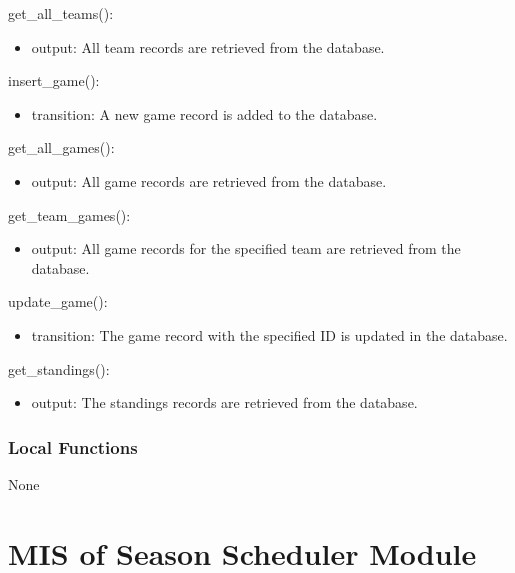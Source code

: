 \documentclass[12pt, titlepage]{article}
\begin{document}
\noindent get\_all\_teams():
\begin{itemize}
\item output: All team records are retrieved from the database.
\end{itemize}

\noindent insert\_game():
\begin{itemize}
\item transition: A new game record is added to the database.
\end{itemize}

\noindent get\_all\_games():
\begin{itemize}
\item output: All game records are retrieved from the database.
\end{itemize}

\noindent get\_team\_games():
\begin{itemize}
\item output: All game records for the specified team are retrieved from the database.
\end{itemize}

\noindent update\_game():
\begin{itemize}
\item transition: The game record with the specified ID is updated in the database.
\end{itemize}

\noindent get\_standings():
\begin{itemize}
\item output: The standings records are retrieved from the database.
\end{itemize}

\subsubsection{Local Functions}


None

\newpage

\section{MIS of Season Scheduler Module} \label{mS}
\end{document}

